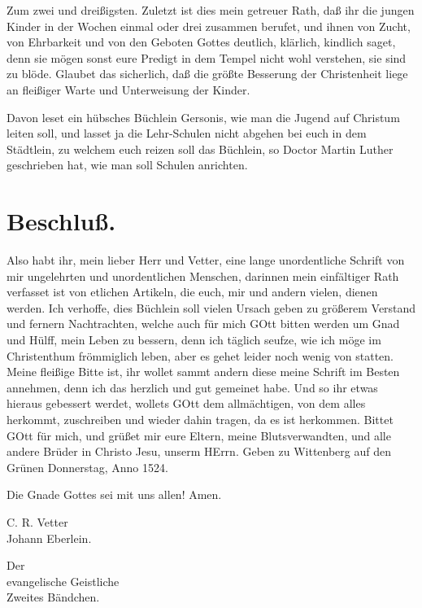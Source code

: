 Zum zwei und dreißigsten. Zuletzt ist dies mein getreuer Rath, daß ihr die jungen Kinder in der Wochen einmal oder drei zusammen berufet, und ihnen von Zucht, von Ehrbarkeit und von den Geboten Gottes deutlich, klärlich, kindlich saget, denn sie mögen sonst eure Predigt in dem Tempel nicht wohl verstehen, sie sind zu blöde. Glaubet das sicherlich, daß die größte Besserung der Christenheit liege an fleißiger Warte und Unterweisung der Kinder.

Davon leset ein hübsches Büchlein Gersonis, wie man die Jugend auf Christum leiten soll, und lasset ja die Lehr-Schulen nicht abgehen bei euch in dem Städtlein, zu welchem euch reizen soll das Büchlein, so Doctor Martin Luther geschrieben hat, wie man soll Schulen anrichten.

\section*{Beschluß.}

Also habt ihr, mein lieber Herr und Vetter, eine lange unordentliche Schrift von mir ungelehrten und unordentlichen Menschen, darinnen mein einfältiger Rath verfasset ist von etlichen Artikeln, die euch, mir und andern vielen, dienen werden. Ich verhoffe, dies Büchlein soll vielen Ursach geben zu größerem Verstand und fernern Nachtrachten, welche auch für mich GOtt bitten werden
um Gnad und Hülff, mein Leben zu bessern, denn ich täglich seufze, wie ich möge im Christenthum frömmiglich leben, aber es gehet leider noch wenig von statten. Meine fleißige Bitte ist, ihr wollet sammt andern diese meine Schrift im Besten annehmen, denn ich das herzlich und gut gemeinet habe. Und so ihr etwas hieraus gebessert werdet, wollets GOtt dem allmächtigen, von dem alles herkommt, zuschreiben und wieder dahin tragen, da es ist herkommen. Bittet GOtt für mich, und grüßet mir eure Eltern, meine Blutsverwandten, und alle andere Brüder in Christo Jesu, unserm HErrn. Geben zu Wittenberg auf den Grünen Donnerstag, Anno 1524.

Die Gnade Gottes sei mit uns allen! Amen.

\begin{flushright}
C. R. Vetter\\
Johann Eberlein.
\end{flushright}

\begin{center}
{\Large Der}\\[1ex]
{\LARGE evangelische Geistliche}\\[2ex]
{\Large Zweites Bändchen.}
\end{center}

